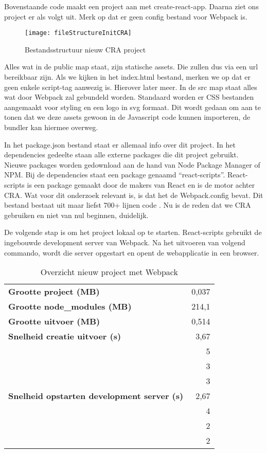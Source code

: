 

Bovenstaande code maakt een project aan met create-react-app. Daarna ziet ons project er als volgt uit. Merk op dat er geen config bestand voor Webpack is.

\begin{figure}[h]
\texttt{[image: fileStructureInitCRA]}
    \centering
    \caption[]{Bestandsstructuur nieuw CRA project}
\end{figure}

Alles wat in de public map staat, zijn statische assets. Die zullen dus via een url bereikbaar zijn. Als we kijken in het index.html bestand, merken we op dat er geen enkele script-tag aanwezig is. Hierover later meer.
In de src map staat alles wat door Webpack zal gebundeld worden. Standaard worden er CSS bestanden aangemaakt voor styling en een logo in svg formaat. Dit wordt gedaan om aan te tonen dat we deze assets gewoon in de Javascript code kunnen importeren, de bundler kan hiermee overweg. 



In het package.json bestand staat er allemaal info over dit project. In het dependencies gedeelte staan alle externe packages die dit project gebruikt. Nieuwe packages worden gedownload aan de hand van Node Package Manager of NPM. Bij de dependencies staat een package genaamd “react-scripts”. 
React-scripts \autocite{facebook-2018} is een package gemaakt door de makers van React en is de motor achter CRA. 
Wat voor dit onderzoek relevant is, is dat het de Webpack.config bevat. Dit bestand bestaat uit maar liefst 700+ lijnen code \autocite{facebook-2021}. Nu is de reden dat we CRA gebruiken en niet van nul beginnen, duidelijk. 

De volgende stap is om het project lokaal op te starten. React-scripts gebruikt de ingebouwde development server van Webpack. Na het uitvoeren van volgend commando, wordt die server opgestart en opent de webapplicatie in een browser.



\begin{table}[h]
    \centering
    \begin{tabular}{lr}
    \textbf{Grootte project (MB)} & 0,037 \\
    \textbf{Grootte node\_modules (MB)} & 214,1 \\
    \textbf{Grootte uitvoer (MB)} & 0,514 \\
    \textbf{Snelheid creatie uitvoer (s)} & 3,67 \\
    \textbf{} & 5 \\
    \textbf{} & 3 \\
    \textbf{} & 3 \\
    \textbf{Snelheid opstarten development server (s)} & 2,67 \\
    \textbf{} & 4 \\
    \textbf{} & 2 \\
    \textbf{} & 2
    \end{tabular}
    \caption[]{Overzicht nieuw project met Webpack}
    \end{table}

